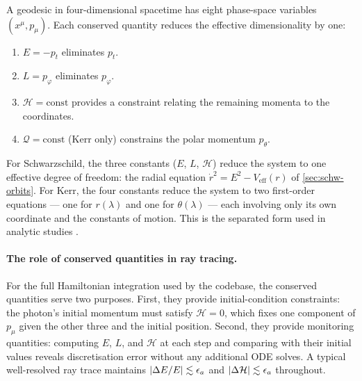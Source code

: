 A geodesic in four-dimensional spacetime has eight phase-space variables
$(x^\mu, p_\mu)$.  Each conserved quantity reduces the effective
dimensionality by one:
%
\begin{enumerate}
\item $E = -p_t$ eliminates $p_t$.
\item $L = p_\varphi$ eliminates $p_\varphi$.
\item $\mathcal{H} = \text{const}$ provides a constraint relating the
  remaining momenta to the coordinates.
\item $\mathcal{Q} = \text{const}$ (Kerr only) constrains the polar
  momentum $p_\theta$.
\end{enumerate}
%
For Schwarzschild, the three constants ($E$, $L$, $\mathcal{H}$) reduce the
system to one effective degree of freedom: the radial equation
$\dot{r}^2 = E^2 - V_{\text{eff}}(r)$ of \cref{sec:schw-orbits}.  For
Kerr, the four constants reduce the system to two first-order equations ---
one for $r(\lambda)$ and one for $\theta(\lambda)$ --- each involving only
its own coordinate and the constants of motion.  This is the separated form
used in analytic studies \cite{Chandrasekhar1983}.

\paragraph{The role of conserved quantities in ray tracing.}

For the full Hamiltonian integration used by the codebase, the conserved
quantities serve two purposes.  First, they provide initial-condition
constraints: the photon's initial momentum must satisfy $\mathcal{H} = 0$,
which fixes one component of $p_\mu$ given the other three and the
initial position.  Second, they provide monitoring quantities: computing $E$,
$L$, and $\mathcal{H}$ at each step and comparing with their initial
values reveals discretisation error without any additional ODE solves.  A
typical well-resolved ray trace maintains $\left\lvert \Delta E/E \right\rvert \lesssim \epsilon_a$
and $\left\lvert \Delta\mathcal{H} \right\rvert \lesssim \epsilon_a$ throughout.
